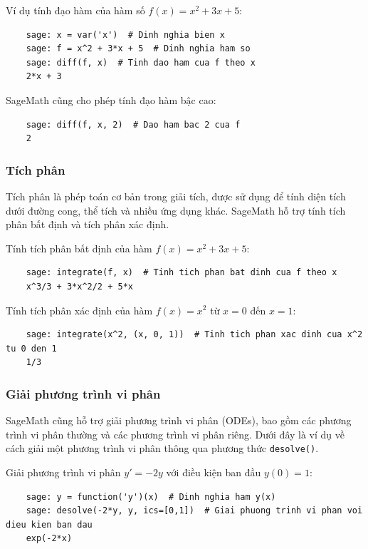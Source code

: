 Ví dụ tính đạo hàm của hàm số \(f(x) = x^2 + 3x + 5\):

\begin{lstlisting}
	sage: x = var('x')  # Dinh nghia bien x
	sage: f = x^2 + 3*x + 5  # Dinh nghia ham so
	sage: diff(f, x)  # Tinh dao ham cua f theo x
	2*x + 3
\end{lstlisting}

SageMath cũng cho phép tính đạo hàm bậc cao:

\begin{lstlisting}
	sage: diff(f, x, 2)  # Dao ham bac 2 cua f
	2
\end{lstlisting}

\subsubsection{Tích phân}

Tích phân là phép toán cơ bản trong giải tích, được sử dụng để tính diện tích dưới đường cong, thể tích và nhiều ứng dụng khác. SageMath hỗ trợ tính tích phân bất định và tích phân xác định.

Tính tích phân bất định của hàm \(f(x) = x^2 + 3x + 5\):

\begin{lstlisting}
	sage: integrate(f, x)  # Tinh tich phan bat dinh cua f theo x
	x^3/3 + 3*x^2/2 + 5*x
\end{lstlisting}

Tính tích phân xác định của hàm \(f(x) = x^2\) từ \(x = 0\) đến \(x = 1\):

\begin{lstlisting}
	sage: integrate(x^2, (x, 0, 1))  # Tinh tich phan xac dinh cua x^2 tu 0 den 1
	1/3
\end{lstlisting}

\subsubsection{Giải phương trình vi phân}

SageMath cũng hỗ trợ giải phương trình vi phân (ODEs), bao gồm các phương trình vi phân thường và các phương trình vi phân riêng. Dưới đây là ví dụ về cách giải một phương trình vi phân thông qua phương thức \texttt{desolve()}.

Giải phương trình vi phân \(y' = -2y\) với điều kiện ban đầu \(y(0) = 1\):

\begin{lstlisting}
	sage: y = function('y')(x)  # Dinh nghia ham y(x)
	sage: desolve(-2*y, y, ics=[0,1])  # Giai phuong trinh vi phan voi dieu kien ban dau
	exp(-2*x)
\end{lstlisting}

